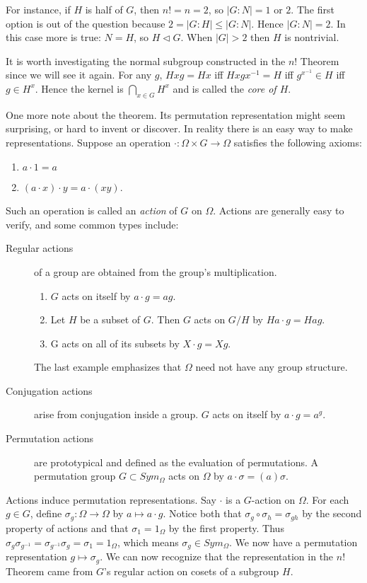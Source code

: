 \documentclass[letterpaper]{article}
\begin{document}
For instance, if $H$ is half of $G$, then $n! = n = 2$, so $|G \colon N| = 1$ or $2$. The first option is out of the question because $2 = |G \colon H| \le |G \colon N|$. Hence $|G \colon N| = 2$. In this case more is true: $N = H$, so $H \lhd G$. When $|G| > 2$ then $H$ is nontrivial.

It is worth investigating the normal subgroup constructed in the $n!$ Theorem since we will see it again. For any $g$, $Hxg = Hx$ iff $Hxgx^{-1} = H$ iff $g^{x^{-1}} \in H$ iff $g \in H^x$. Hence the kernel is $\bigcap \limits_{x \in G}H^x$ and is called the \emph{core of $H$}.

One more note about the theorem. Its permutation representation might seem surprising, or hard to invent or discover. In reality there is an easy way to make representations. Suppose an operation $\cdot \colon \Omega \times G \rightarrow \Omega$ satisfies the following axioms:
\begin{enumerate}
\item $a \cdot 1 = a$
\item $(a \cdot x) \cdot y = a \cdot (xy)$.
\end{enumerate}
Such an operation is called an \emph{action} of $G$ on $\Omega$. Actions are generally easy to verify, and some common types include:

\begin{description}
\item[Regular actions] of a group are obtained from the group's multiplication.
\begin{enumerate}
\item $G$ acts on itself by $a\cdot g = ag$.
\item Let $H$ be a subset of $G$. Then $G$ acts on $G/H$ by $Ha\cdot g = Hag$.
\item G acts on all of its subsets by $X\cdot g = Xg$.
\end{enumerate}
The last example emphasizes that $\Omega$ need not have any group structure.
\item[Conjugation actions] arise from conjugation inside a group. $G$ acts on itself by $a\cdot g = a^g$.
\item[Permutation actions] are prototypical and defined as the evaluation of permutations. A permutation group $G \subset Sym_\Omega$ acts on $\Omega$ by $a\cdot \sigma = (a)\sigma$.
\end{description}

Actions induce permutation representations. Say $\cdot$ is a $G$-action on $\Omega$. For each $g \in G$, define $\sigma_g \colon \Omega \rightarrow \Omega$ by $a \mapsto a\cdot g$. Notice both that $\sigma_g \circ \sigma_h = \sigma_{gh}$ by the second property of actions and that $\sigma_1 = 1_\Omega$ by the first property. Thus $\sigma_g \sigma_{g^{-1}} = \sigma_{g^{-1}}\sigma_g = \sigma_1 = 1_\Omega$, which means $\sigma_g \in Sym_\Omega$. We now have a permutation representation $g \mapsto \sigma_g$. We can now recognize that the representation in the $n!$ Theorem came from $G$'s regular action on cosets of a subgroup $H$.
\end{document}
